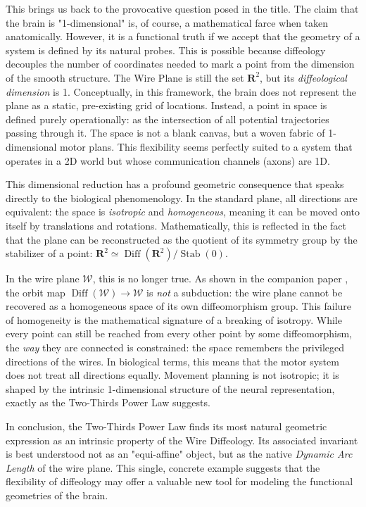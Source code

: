 \documentclass[10pt,letterpaper,reqno]{amsart}
\newcommand{\RR}{\mathbf{R}}
\newcommand{\cW}{\mathcal{W}}
\DeclareMathOperator{\Diff}{Diff}
\DeclareMathOperator{\Stab}{Stab}
\begin{document}
  This brings us back to the provocative question posed in the title.
  The claim that the brain is "1-dimensional" is,
  of course,
  a mathematical farce when taken anatomically.
  However,
  it is a functional truth if we accept that the geometry of a system is defined by its natural probes.
  This is possible because diffeology decouples the number of coordinates needed to mark a point from the dimension of the smooth structure.
  The Wire Plane is still the set $\RR^2$,
  but its \emph{diffeological dimension} is 1.
  Conceptually,
  in this framework,
  the brain does not represent the plane as a static,
  pre-existing grid of locations.
  Instead,
  a point in space is defined purely operationally:
  as the intersection of all potential trajectories passing through it.
  The space is not a blank canvas,
  but a woven fabric of 1-dimensional motor plans.
  This flexibility seems perfectly suited to a system that operates in a 2D world but whose communication channels (axons) are 1D.
  
  This dimensional reduction has a profound geometric consequence that speaks directly
  to the biological phenomenology.
  In the standard plane, all directions are equivalent:
  the space is \emph{isotropic} and \emph{homogeneous},
  meaning it can be moved onto itself by translations and rotations.
  Mathematically, this is reflected in the fact that the plane can be reconstructed
  as the quotient of its symmetry group by the stabilizer of a point:
  $\RR^2 \simeq \Diff(\RR^2) / \Stab(0)$.
  
  In the wire plane $\cW$, this is no longer true.
  As shown in the companion paper \cite{PIZ25},
  the orbit map $\Diff(\cW) \to \cW$ is \emph{not} a subduction:
  the wire plane cannot be recovered as a homogeneous space of its own diffeomorphism group.
  This failure of homogeneity is the mathematical signature of a breaking of isotropy.
  While every point can still be reached from every other point by some diffeomorphism,
  the \emph{way} they are connected is constrained:
  the space remembers the privileged directions of the wires.
  In biological terms, this means that the motor system does not treat all directions equally.
  Movement planning is not isotropic;
  it is shaped by the intrinsic 1-dimensional structure of the neural representation,
  exactly as the Two-Thirds Power Law suggests.
  
  In conclusion,
  the Two-Thirds Power Law finds its most natural geometric expression as an intrinsic property of the Wire Diffeology.
  Its associated invariant is best understood not as an "equi-affine" object,
  but as the native \emph{Dynamic Arc Length} of the wire plane.
  This single,
  concrete example suggests that the flexibility of diffeology may offer a valuable new tool for modeling the functional geometries of the brain.
    
\end{document}
